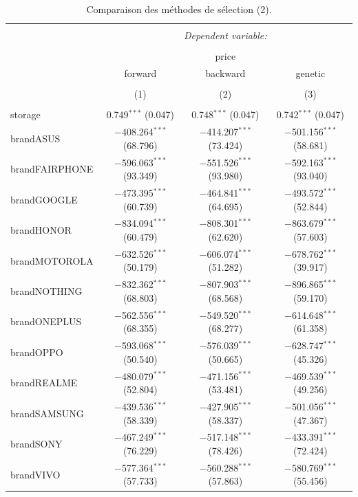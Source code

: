 \documentclass[
  12pt,
]{report}
\begin{document}
\begin{table}[!htbp] \centering 
  \caption{Comparaison des méthodes de sélection (2).} 
  \label{} 
\footnotesize 
\begin{tabular}{@{\extracolsep{5pt}}lccc} 
\\[-1.8ex]\hline 
\hline \\[-1.8ex] 
 & \multicolumn{3}{c}{\textit{Dependent variable:}} \\ 
\cline{2-4} 
\\[-1.8ex] & \multicolumn{3}{c}{price} \\ 
 & forward & backward & genetic \\ 
\\[-1.8ex] & (1) & (2) & (3)\\ 
\hline \\[-1.8ex] 
 storage & 0.749$^{***}$ (0.047) & 0.748$^{***}$ (0.047) & 0.742$^{***}$ (0.047) \\ 
  brandASUS & $-$408.264$^{***}$ (68.796) & $-$414.207$^{***}$ (73.424) & $-$501.156$^{***}$ (58.681) \\ 
  brandFAIRPHONE & $-$596.063$^{***}$ (93.349) & $-$551.526$^{***}$ (93.980) & $-$592.163$^{***}$ (93.040) \\ 
  brandGOOGLE & $-$473.395$^{***}$ (60.739) & $-$464.841$^{***}$ (64.695) & $-$493.572$^{***}$ (52.844) \\ 
  brandHONOR & $-$834.094$^{***}$ (60.479) & $-$808.301$^{***}$ (62.620) & $-$863.679$^{***}$ (57.603) \\ 
  brandMOTOROLA & $-$632.526$^{***}$ (50.179) & $-$606.074$^{***}$ (51.282) & $-$678.762$^{***}$ (39.917) \\ 
  brandNOTHING & $-$832.362$^{***}$ (68.803) & $-$807.903$^{***}$ (68.568) & $-$896.865$^{***}$ (59.170) \\ 
  brandONEPLUS & $-$562.556$^{***}$ (68.355) & $-$549.520$^{***}$ (68.277) & $-$614.648$^{***}$ (61.358) \\ 
  brandOPPO & $-$593.068$^{***}$ (50.540) & $-$576.039$^{***}$ (50.665) & $-$628.747$^{***}$ (45.326) \\ 
  brandREALME & $-$480.079$^{***}$ (52.804) & $-$471.156$^{***}$ (53.481) & $-$469.539$^{***}$ (49.256) \\ 
  brandSAMSUNG & $-$439.536$^{***}$ (58.339) & $-$427.905$^{***}$ (58.337) & $-$501.056$^{***}$ (47.367) \\ 
  brandSONY & $-$467.249$^{***}$ (76.229) & $-$517.148$^{***}$ (78.426) & $-$433.391$^{***}$ (72.424) \\ 
  brandVIVO & $-$577.364$^{***}$ (57.733) & $-$560.288$^{***}$ (57.863) & $-$580.769$^{***}$ (55.456) \\ 

\end{tabular}
\end{table}
\end{document}
